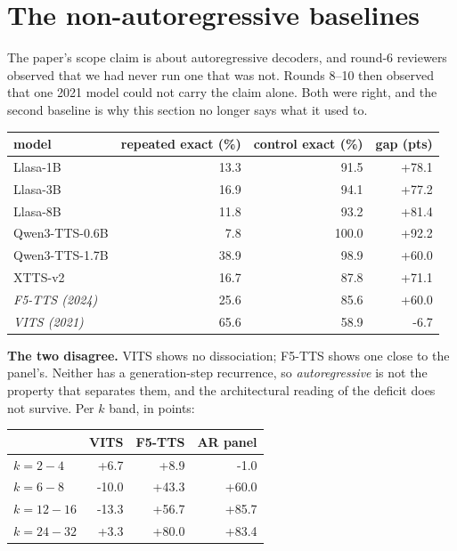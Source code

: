 \documentclass[11pt]{article}
\begin{document}
\section{The non-autoregressive baselines}
\label{sec:s13}

The paper's scope claim is about autoregressive decoders, and round-6 reviewers
observed that we had never run one that was not. Rounds 8--10 then observed that
one 2021 model could not carry the claim alone. Both were right, and the second
baseline is why this section no longer says what it used to.

\begin{center}
\begin{tabular}{lrrr}
\toprule
model & repeated exact (\%) & control exact (\%) & gap (pts) \\
\midrule
Llasa-1B & 13.3 & 91.5 & +78.1 \\
Llasa-3B & 16.9 & 94.1 & +77.2 \\
Llasa-8B & 11.8 & 93.2 & +81.4 \\
Qwen3-TTS-0.6B & 7.8 & 100.0 & +92.2 \\
Qwen3-TTS-1.7B & 38.9 & 98.9 & +60.0 \\
XTTS-v2 & 16.7 & 87.8 & +71.1 \\
\midrule
\emph{F5-TTS (2024)} & 25.6 & 85.6 & +60.0 \\
\emph{VITS (2021)} & 65.6 & 58.9 & -6.7 \\
\bottomrule
\end{tabular}
\end{center}

\noindent\textbf{The two disagree.} VITS shows no dissociation; F5-TTS shows one
close to the panel's. Neither has a generation-step recurrence, so
\emph{autoregressive} is not the property that separates them, and the
architectural reading of the deficit does not survive. Per $k$ band, in points:

\begin{center}
\begin{tabular}{lrrr}
\toprule
 & VITS & F5-TTS & AR panel \\
\midrule
$k=2-4$ & +6.7 & +8.9 & -1.0 \\
$k=6-8$ & -10.0 & +43.3 & +60.0 \\
$k=12-16$ & -13.3 & +56.7 & +85.7 \\
$k=24-32$ & +3.3 & +80.0 & +83.4 \\
\bottomrule
\end{tabular}
\end{center}
\end{document}
